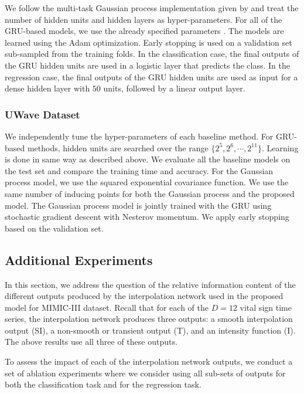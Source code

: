 \documentclass{article} \usepackage{iclr2019_conference,times}
\begin{document}
We follow the multi-task Gaussian process implementation given by \cite{futoma2017improved} and treat the number of hidden units and hidden layers as hyper-parameters.  For all of the GRU-based models, we use the already specified parameters \citep{che2016recurrent}. The models are learned using the Adam optimization. Early
stopping is used on a validation set sub-sampled from the training folds. In the classification case,
the final outputs of the GRU hidden units are used in a logistic layer that predicts the class.
In the regression case, the final outputs of the GRU hidden units
are used as input for a dense hidden layer with $50$ units, followed by a linear output layer. 

\subsubsection*{UWave Dataset} 
We independently tune the hyper-parameters of each baseline method. For GRU-based methods, hidden units are searched over the range $\{2^5, 2^6 , \cdots, 2^{11}\}$. Learning is done in same way as described above.  We evaluate all the baseline models on the test set and compare the training time and accuracy. For the Gaussian process model, we use the squared exponential covariance function.  We use the same number of inducing points for both the Gaussian process and the proposed model. The Gaussian process model is jointly trained with the GRU using stochastic gradient descent with Nesterov momentum. We apply early stopping based on the validation set.

\subsection{Additional Experiments}
\label{ablation}

In this section, we address the question of the relative information content of the different 
outputs produced by the interpolation network used in the proposed model for MIMIC-III dataset.
Recall that for each of the $D=12$ vital sign time series, the interpolation
network produces three outputs: a smooth interpolation output (SI), a non-smooth
or transient output (T), and an intensity function (I). The above results
use all three of these outputs. 

To assess the impact of each of the interpolation network outputs, we conduct a
set of ablation experiments where we consider using all sub-sets of outputs 
for both the classification task and for the regression task. 
\end{document}
